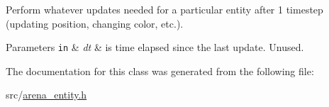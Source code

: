 Perform whatever updates needed for a particular entity after 1 timestep (updating position, changing color, etc.). 


\begin{DoxyParams}[1]{Parameters}
\mbox{\tt in}  & {\em dt} & is time elapsed since the last update. Unused. \\
\hline
\end{DoxyParams}


The documentation for this class was generated from the following file\+:\begin{DoxyCompactItemize}
\item 
src/\hyperlink{arena__entity_8h}{arena\+\_\+entity.\+h}\end{DoxyCompactItemize}
